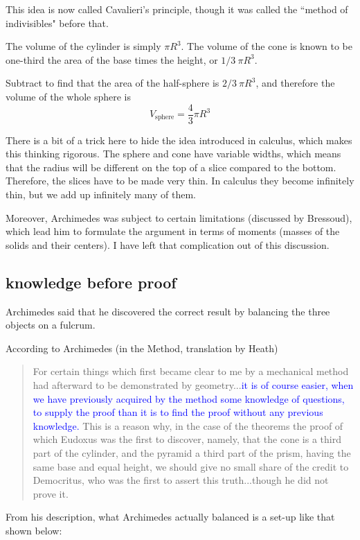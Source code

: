 \documentclass[11pt, oneside]{article}
\begin{document}
This idea is now called Cavalieri's principle, though it was called the ``method of indivisibles" before that.

The volume of the cylinder is simply $\pi R^3$.  The volume of the cone is known to be one-third the area of the base times the height, or $1/3 \ \pi R^3$.

Subtract to find that the area of the half-sphere is $2/3 \ \pi R^3$, and therefore the volume of the whole sphere is
\[ V_{\text{sphere}} = \frac{4}{3} \pi R^3 \]

There is a bit of a trick here to hide the idea introduced in calculus, which makes this thinking rigorous.  The sphere and cone have variable widths, which means that the radius will be different on the top of a slice compared to the bottom.  Therefore, the slices have to be made very thin.  In calculus they become infinitely thin, but we add up infinitely many of them.

Moreover, Archimedes was subject to certain limitations (discussed by Bressoud), which lead him to formulate the argument in terms of moments (masses of the solids and their centers).  I have left that complication out of this discussion.

\subsection*{knowledge before proof}

Archimedes said that he discovered the correct result by balancing the three objects on a fulcrum.  

According to Archimedes (in the Method, translation by Heath)

\begin{quote}For certain things which first became clear to me by a mechanical method had afterward to be demonstrated by geometry...\textcolor{blue}{it is of course easier, when we have previously acquired by the method some knowledge of questions, to supply the proof than it is to find the proof without any previous knowledge.} This is a reason why, in the case of the theorems the proof of which Eudoxus was the first to discover, namely, that the cone is a third part of the cylinder, and the pyramid a third part of the prism, having the same base and equal height, we should give no small share of the credit to Democritus, who was the first to assert this truth...though he did not prove it.
\end{quote}

From his description, what Archimedes actually balanced is a set-up like that shown below:
\end{document}
